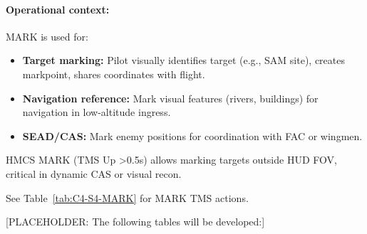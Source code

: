 \documentclass[11pt, a4paper, twoside]{report}
\newenvironment{hotastable}[1]{%
	\small
	\setlength{\tabcolsep}{2pt}
	\renewcommand{\arraystretch}{1.25}
	\begin{longtable}{L{1.00cm} L{0.90cm} L{0.90cm} L{3.30cm} L{6.40cm} L{1.40cm} L{2.10cm}}
		\caption{#1}\\
		\rowcolor{headerblue}
		\multicolumn{1}{>{\centering\arraybackslash}p{1.00cm}}{\textbf{\color{white}Mode}} &
		\multicolumn{1}{>{\centering\arraybackslash}p{0.90cm}}{\textbf{\color{white}Dir.}} &
		\multicolumn{1}{>{\centering\arraybackslash}p{0.90cm}}{\textbf{\color{white}Act.}} &
		\multicolumn{1}{>{\centering\arraybackslash}p{3.30cm}}{\textbf{\color{white}Function}} &
		\multicolumn{1}{>{\centering\arraybackslash}p{6.40cm}}{\textbf{\color{white}Effect / Nuance}} &
		\multicolumn{1}{>{\centering\arraybackslash}p{1.40cm}}{\textbf{\color{white}Dash34}} &
		\multicolumn{1}{>{\centering\arraybackslash}p{2.10cm}}{\textbf{\color{white}Train.}} \\
		\endfirsthead
		\rowcolor{headerblue}
		\multicolumn{1}{>{\centering\arraybackslash}p{1.00cm}}{\textbf{\color{white}Mode}} &
		\multicolumn{1}{>{\centering\arraybackslash}p{0.90cm}}{\textbf{\color{white}Dir.}} &
		\multicolumn{1}{>{\centering\arraybackslash}p{0.90cm}}{\textbf{\color{white}Act.}} &
		\multicolumn{1}{>{\centering\arraybackslash}p{3.30cm}}{\textbf{\color{white}Function}} &
		\multicolumn{1}{>{\centering\arraybackslash}p{6.40cm}}{\textbf{\color{white}Effect / Nuance}} &
		\multicolumn{1}{>{\centering\arraybackslash}p{1.40cm}}{\textbf{\color{white}Dash34}} &
		\multicolumn{1}{>{\centering\arraybackslash}p{2.10cm}}{\textbf{\color{white}Train.}} \\
		\endhead
		\multicolumn{7}{r}{\small\emph{Continued on next page}}\\
		\endfoot
		\endlastfoot
	}{%
	\end{longtable}
}
\begin{document}
\paragraph{Operational context:}
MARK is used for:
\begin{itemize}
    \item \textbf{Target marking:} Pilot visually identifies target (e.g., SAM site), creates markpoint, shares coordinates with flight.
    \item \textbf{Navigation reference:} Mark visual features (rivers, buildings) for navigation in low-altitude ingress.
    \item \textbf{SEAD/CAS:} Mark enemy positions for coordination with FAC or wingmen.
\end{itemize}

HMCS MARK (TMS Up >0.5s) allows marking targets outside HUD FOV, critical in dynamic CAS or visual recon.

See Table~\ref{tab:C4-S4-MARK} for MARK TMS actions.


[PLACEHOLDER: The following tables will be developed:]


\end{document}
